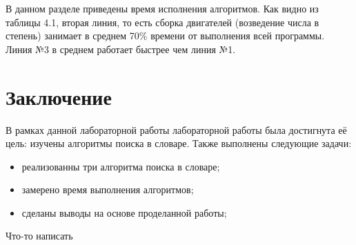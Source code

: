 \documentclass[12pt]{report}
\begin{document}
В данном разделе приведены время исполнения алгоритмов. Как видно из таблицы 4.1, вторая линия, то есть сборка двигателей (возведение числа в степень) занимает в среднем 70\% времени от выполнения всей программы. Линия №3 в среднем работает быстрее чем линия №1.
	
\chapter*{Заключение}
	
В рамках данной лабораторной работы лабораторной работы была достигнута её цель: изучены алгоритмы поиска в словаре. Также выполнены следующие задачи:
	
\begin{itemize}
	\item реализованны три алгоритма поиска в словаре;
	\item замерено время выполнения алгоритмов;
	\item сделаны выводы на основе проделанной работы;
\end{itemize}

Что-то написать

	
\end{document}
